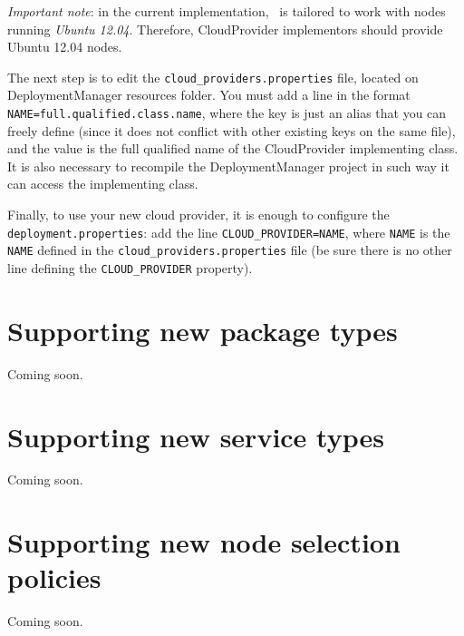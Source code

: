 \emph{Important note}: in the current implementation, \ee\ is tailored to work with nodes running \emph{Ubuntu 12.04}. Therefore, \textsf{CloudProvider} implementors should provide Ubuntu 12.04 nodes. 

The next step is to edit the \texttt{cloud\_providers.properties} file, located on DeploymentManager resources folder. You must add a line in the format \verb!NAME=full.qualified.class.name!, where the key is just an alias that you can freely define (since it does not conflict with other existing keys on the same file), and the value is the full qualified name of the \textsf{CloudProvider} implementing class. It is also necessary to recompile the DeploymentManager project in such way it can access the implementing class.

Finally, to use your new cloud provider, it is enough to configure the \texttt{deployment.properties}: add the line \verb!CLOUD_PROVIDER=NAME!, where \verb!NAME! is the \verb!NAME! defined in the \texttt{cloud\_providers.properties} file (be sure there is no other line defining the \verb!CLOUD_PROVIDER! property).

\section{Supporting new package types}

Coming soon.

\section{Supporting new service types}

Coming soon.

\section{Supporting new node selection policies}

Coming soon.
